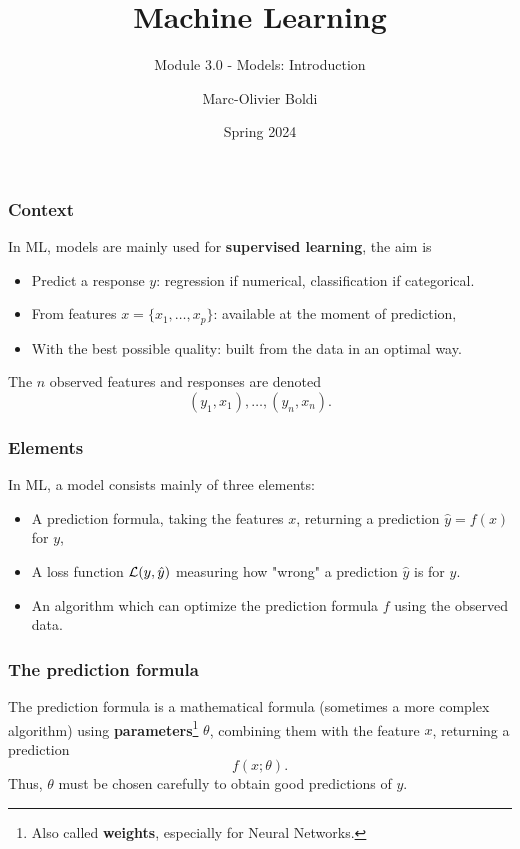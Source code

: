 
\title{Machine Learning}
\subtitle{Module 3.0 - Models: Introduction}
\author[MOB]{Marc-Olivier Boldi}
\date[Spring 2024]{Spring 2024}

\begin{frame}
  \titlepage
\end{frame}
\begin{frame}
\frametitle{Context}
In ML, models are mainly used for {\bf supervised learning}, the aim is
\begin{itemize}
\item Predict a response $y$: regression if numerical, classification if categorical.
\item From features $x=\{x_1, \ldots, x_p\}$: available at the moment of prediction,
\item With the best possible quality: built from the data in an optimal way.
\end{itemize}
The $n$ observed features and responses are denoted 
$$
(y_1, x_1), \ldots, (y_n, x_n).
$$
\end{frame}
\begin{frame}
\frametitle{Elements}
In ML, a model consists mainly of three elements:
\begin{itemize}
\item A prediction formula, taking the features $x$, returning a prediction $\hat{y} = f(x)$ for $y$,
\item A loss function ${\cal L}(y,\hat{y})$ measuring how "wrong" a prediction $\hat{y}$ is for $y$.
\item An algorithm which can optimize the prediction formula $f$ using the observed data.
\end{itemize}
\end{frame}
\begin{frame}
\frametitle{The prediction formula}
The prediction formula is a mathematical formula (sometimes a more complex algorithm) using {\bf parameters}\footnote{Also called {\bf weights}, especially for Neural Networks.} $\theta$, combining them with the feature $x$, returning a prediction
$$
f(x;\theta).
$$
Thus, $\theta$ must be chosen carefully to obtain good predictions of $y$.
\end{frame}
